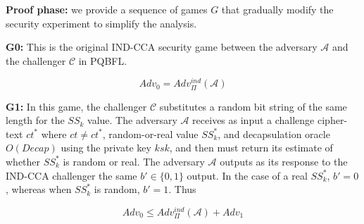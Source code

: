 \documentclass[a4paper,fleqn]{cas-dc}
\begin{document}
 

\textbf{Proof phase:} we provide a sequence of games $G$ that gradually modify the security experiment to simplify the analysis. 


\textbf{G0:} This is the original IND-CCA security game between the adversary $\mathcal{A}$ and the challenger $\mathcal{C}$ in PQBFL. 

$$
    Adv_{0}= Adv_{\Pi}^{ind}(\mathcal{A})
$$

\textbf{G1:} In this game, the challenger $\mathcal{C}$ substitutes a random bit string of the same length for the $SS_{k}$ value. 
The adversary $\mathcal{A}$ receives as input a challenge cipher-text $ct^{*}$ where $ct\neq ct^{*}$, random-or-real value $SS_{k}^{*}$, and decapsulation oracle $O(Decap)$  using the private key $ksk$, and then must return its estimate of whether $SS_{k}^{*}$ is random or real. 
The adversary $\mathcal{A}$ outputs as its response to the IND-CCA challenger the same $b' \in \{0,1\}$ output. In the case of a real $SS_{k}^{*}$, $b'=0$, whereas when $SS_{k}^{*}$ is random, $b'=1$. 
Thus

$$
    Adv_{0} \leq Adv_{\Pi}^{ind}(\mathcal{A})+ Adv_{1}
$$


\end{document}
